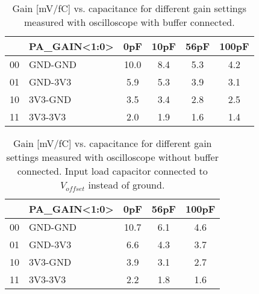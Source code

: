 \documentclass[../main/thesis.tex]{subfiles}
\begin{document}
\begin{table}[h!]
	\begin{center}
		\caption{Gain [mV/fC] vs. capacitance for different gain settings measured with oscilloscope with buffer connected.}
		\label{tab-gain-wbuffer}
		\begin{tabular}{clcccc}\toprule
			&\textbf{PA\_GAIN<1:0>} & \textbf{0pF}  & \textbf{10pF} & \textbf{56pF} & \textbf{100pF} \\ \midrule
			00&GND-GND     & 10.0 & 8.4  & 5.3  & 4.2   \\
			01&GND-3V3    & 5.9    & 5.3  & 3.9    & 3.1   \\
			10&3V3-GND     & 3.5  & 3.4  & 2.8  & 2.5   \\
			11&3V3-3V3     & 2.0    & 1.9  & 1.6  & 1.4 \\ \bottomrule
		\end{tabular}
	\end{center}
\end{table}


\begin{table}[h!]
	\begin{center}
		\caption{Gain [mV/fC] vs. capacitance for different gain settings measured with oscilloscope without buffer connected. Input load capacitor connected to $V_{offset}$ instead of ground.}
		\label{tab-gain-nobuffer-offset}
		\begin{tabular}{clccc}\toprule
			&\textbf{PA\_GAIN<1:0>} & \textbf{0pF}  & \textbf{56pF} & \textbf{100pF} \\ \midrule
			00&GND-GND     & 10.7 & 6.1  & 4.6  \\
			01&GND-3V3     & 6.6  & 4.3  & 3.7   \\
			10&3V3-GND     & 3.9 & 3.1 & 2.7   \\
			11&3V3-3V3     & 2.2 & 1.8 & 1.6   \\ \bottomrule
		\end{tabular}
	\end{center}
\end{table}
\end{document}

